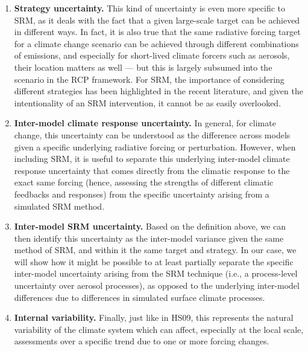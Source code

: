 \documentclass[draft]{agujournal2019}
\begin{document}
\begin{enumerate}
    \item \textbf{Strategy uncertainty.} This kind of uncertainty is even more specific to SRM, as it deals with the fact that a given large-scale target can be achieved in different ways. In fact, it is also true that the same radiative forcing target for a climate change scenario can be achieved through different combinations of emissions, and especially for short-lived climate forcers such as aerosols, their location matters as well --- but this is largely subsumed into the scenario in the RCP framework. For SRM, the importance of considering different strategies has been highlighted in the recent literature, and given the intentionality of an SRM intervention, it cannot be as easily overlooked.

    \item \textbf{Inter-model climate response uncertainty.} In general, for climate change, this uncertainty can be understood as the difference across models given a specific underlying radiative forcing or perturbation. However, when including SRM, it is useful to separate this underlying inter-model climate response uncertainty that comes directly from the climatic response to the exact same forcing (hence, assessing the strengths of different climatic feedbacks and responses) from the specific uncertainty arising from a simulated SRM method.

    \item \textbf{Inter-model SRM uncertainty.} Based on the definition above, we can then identify this uncertainty as the inter-model variance given the same method of SRM, and within it the same target and strategy. In our case, we will show how it might be possible to at least partially separate the specific inter-model uncertainty arising from the SRM technique (i.e., a process-level uncertainty over aerosol processes), as opposed to the underlying inter-model differences due to differences in simulated surface climate processes.

    \item \textbf{Internal variability.} Finally, just like in HS09, this represents the natural variability of the climate system which can affect, especially at the local scale, assessments over a specific trend due to one or more forcing changes.
\end{enumerate}
\end{document}
